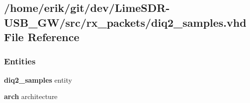 \subsection{/home/erik/git/dev/\+Lime\+S\+D\+R-\/\+U\+S\+B\+\_\+\+G\+W/src/rx\+\_\+packets/diq2\+\_\+samples.vhd File Reference}
\label{diq2__samples_8vhd}
\subsubsection*{Entities}
\begin{DoxyCompactItemize}
\item 
{\bf diq2\+\_\+samples} entity
\item 
{\bf arch} architecture
\end{DoxyCompactItemize}
